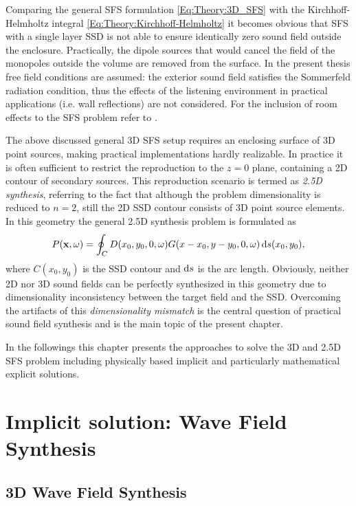 Comparing the general SFS formulation \eqref{Eq:Theory:3D_SFS} with the Kirchhoff-Helmholtz integral \eqref{Eq:Theory:Kirchhoff-Helmholtz} it becomes obvious that SFS with a single layer SSD is not able to ensure identically zero sound field outside the enclosure.
Practically, the dipole sources that would cancel the field of the monopoles outside the volume are removed from the surface.
In the present thesis free field conditions are assumed: the exterior sound field satisfies the Sommerfeld radiation condition, thus the effects of the listening environment in practical applications (i.e. wall reflections) are not considered. 
For the inclusion of room effects to the SFS problem refer to \cite{Spors2005, app8010016}.

\vspace{3mm}
The above discussed general 3D SFS setup requires an enclosing surface of 3D point sources, making practical implementations hardly realizable.
In practice it is often sufficient to restrict the reproduction to the $z=0$ plane, containing a 2D contour of secondary sources.
This reproduction scenario is termed as \emph{2.5D synthesis}, referring to the fact that although the problem dimensionality is reduced to $n=2$, still the 2D SSD contour consists of 3D point source elements.
In this geometry the general 2.5D synthesis problem is formulated as
\begin{equation}
P(\mathbf{x},\omega) = \oint_{C} D(x_0,y_0,0,\omega) G(x - x_0, y-y_0, 0 , \omega ) \, \mathrm{d} s( x_0, y_0 ),
\label{Eq:Theory:25D_SFS}
\end{equation}
where $C(x_0,y_0)$ is the SSD contour and $\mathrm{d} s$ is the arc length.
Obviously, neither 2D nor 3D sound fields can be perfectly synthesized in this geometry due to dimensionality inconsistency between the target field and the SSD.
Overcoming the artifacts of this \emph{dimensionality mismatch} is the central question of practical sound field synthesis and is the main topic of the present chapter.

In the followings this chapter presents the approaches to solve the 3D and 2.5D SFS problem including physically based implicit and particularly mathematical explicit solutions. 

\section{Implicit solution: Wave Field Synthesis}

\subsection{3D Wave Field Synthesis}

